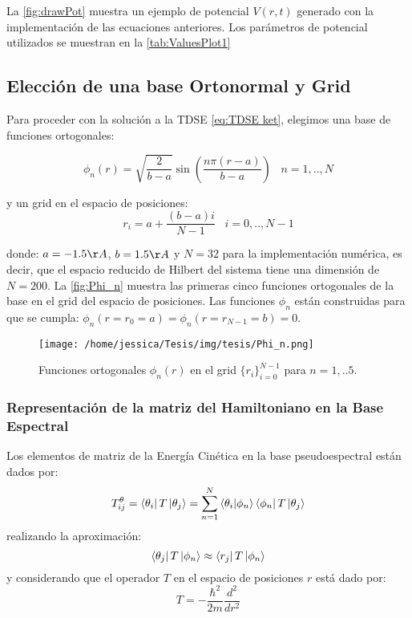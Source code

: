 La \autoref{fig:drawPot} muestra un ejemplo de potencial $V(r,t)$ generado con la implementación de las ecuaciones anteriores. Los parámetros de potencial utilizados se muestran en la \autoref{tab:ValuesPlot1}

\subsection{Elección de una base Ortonormal y Grid}

Para proceder con la solución a la TDSE \autoref{eq:TDSE ket}, elegimos una base de funciones ortogonales: \cite{Colbert1992}

\begin{equation}
  \label{eq:eigenfunc}
  \phi_n(r)=\sqrt{\frac{2}{b-a}}\sin\left( \frac{n\pi(r-a)}{b-a}\right) \,\,\,\,\, n=1,..,N
\end{equation}

y un grid en el espacio de posiciones:
\begin{equation}
  \label{eq:grid}
  r_i = a + \frac{(b-a)i}{N-1} \,\,\,\,\, i=0,..,N-1
\end{equation}

donde: $a=-1.5\AA$, $b=1.5\AA$ y $N=32$ para la implementación numérica, es decir, que el espacio reducido de Hilbert del sistema tiene una dimensión de $N=200$. La \autoref{fig:Phi_n} muestra las primeras cinco funciones ortogonales de la base en el grid del espacio de posiciones. Las funciones $\phi_n$ están construidas para que se cumpla: $\phi_n(r=r_0=a)=\phi_n(r=r_{N-1}=b)=0$.

\begin{figure}[ht]
  \centering
  \texttt{[image: /home/jessica/Tesis/img/tesis/Phi\_n.png]}
  \caption{Funciones ortogonales $\phi_n(r)$ en el grid $\{r_i\}_{i=0}^{N-1}$ para $n=1,..5$.}
  \label{fig:Phi_n}
\end{figure}

\subsubsection{Representación de la matriz del Hamiltoniano en la Base Espectral}

Los elementos de matriz de la Energía Cinética en la base pseudoespectral están dados por:
\begin{equation}
  \label{eq:T}
T^{\theta}_{ij}= \bra{\theta_i}T\ket{\theta_j}=\sum_{n=1}^N\bra{\theta_i}\ket{\phi_n}\bra{\phi_n}T\ket{\theta_j}
\end{equation}
realizando la aproximación:
$$\bra{\theta_j}T\ket{\phi_n} \approx \bra{r_j}T\ket{\phi_n}$$
y considerando que el operador $T$ en el espacio de posiciones $r$ está dado por:
\begin{equation}
  \label{eq:Toperator}
  T = -\frac{\hbar^2}{2m}\frac{d^2}{dr^2}
\end{equation}


